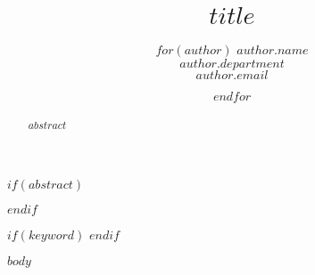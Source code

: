 \documentclass{article}
\title{$title$}
\author{
  $for(author)$
    $author.name$ \\
    $author.department$ \\
    \texttt{$author.email$}
    \and
  $endfor$
}
\begin{document}
\maketitle

$if(abstract)$
\begin{abstract}
  $abstract$
\end{abstract}
$endif$

$if(keyword)$
$endif$

$body$
\end{document}
